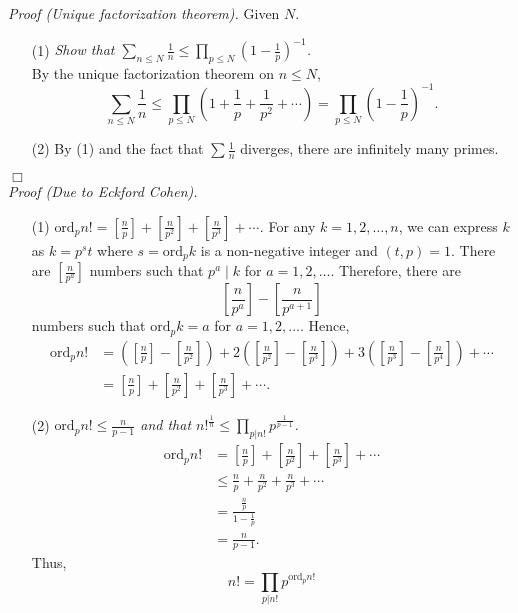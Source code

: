 \documentclass{article}
\begin{document}
\emph{Proof (Unique factorization theorem).}
Given $N$.
\begin{enumerate}
\item[(1)]
\emph{Show that $\sum_{n \leq N} \frac{1}{n}
\leq \prod_{p \leq N} \left( 1 - \frac{1}{p} \right)^{-1}$.} \\
By the unique factorization theorem on $n \leq N$,
$$\sum_{n \leq N} \frac{1}{n}
\leq \prod_{p \leq N} \left( 1 + \frac{1}{p} + \frac{1}{p^2} + \cdots \right)
= \prod_{p \leq N} \left( 1 - \frac{1}{p} \right)^{-1}.$$
\item[(2)]
By (1) and the fact that $\sum \frac{1}{n}$ diverges,
there are infinitely many primes.
\end{enumerate}
$\Box$ \\

\emph{Proof (Due to Eckford Cohen).}
\begin{enumerate}
\item[(1)]
\emph{$\text{ord}_p n!
= \left[\frac{n}{p}\right] + \left[\frac{n}{p^2}\right] + \left[\frac{n}{p^3}\right] + \cdots$.}
For any $k = 1, 2, \ldots, n$, we can express $k$ as $k = p^s t$
where $s = \text{ord}_p k$ is a non-negative integer and $(t, p) = 1$.
There are $[\frac{n}{p^a}]$ numbers such that $p^a \mid k$ for $a = 1, 2, \ldots$.
Therefore, there are $$\left[\frac{n}{p^a}\right] - \left[\frac{n}{p^{a+1}}\right]$$
numbers such that $\text{ord}_p k = a$ for $a = 1, 2, \ldots$. Hence,
\begin{align*}
\text{ord}_p n!
&= \left( \left[\frac{n}{p}\right] - \left[\frac{n}{p^2}\right] \right)
 + 2 \left( \left[\frac{n}{p^2}\right] - \left[\frac{n}{p^3}\right] \right)
 + 3 \left( \left[\frac{n}{p^3}\right] - \left[\frac{n}{p^4}\right] \right) + \cdots \\
&= \left[\frac{n}{p}\right] + \left[\frac{n}{p^2}\right] + \left[\frac{n}{p^3}\right] + \cdots.
\end{align*}
\item[(2)]
\emph{$\text{ord}_p n! \leq \frac{n}{p - 1}$ and that
$n!^{\frac{1}{n}} \leq \prod_{p|n!}p^{\frac{1}{p - 1}}$.}
\begin{align*}
\text{ord}_p n!
&= \left[\frac{n}{p}\right] + \left[\frac{n}{p^2}\right] + \left[\frac{n}{p^3}\right] + \cdots \\
&\leq \frac{n}{p} + \frac{n}{p^2} + \frac{n}{p^3} + \cdots \\
&= \frac{\frac{n}{p}}{1 - \frac{1}{p}} \\
&= \frac{n}{p - 1}.
\end{align*}
Thus,
$$n!
= \prod_{p|n!} p^{\text{ord}_p n!}
$$
\end{enumerate}
\end{document}
